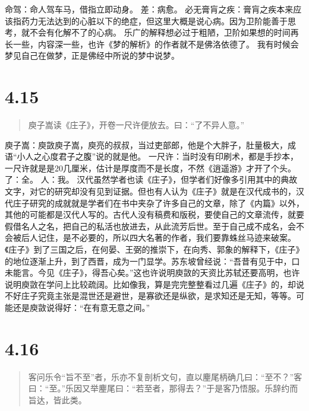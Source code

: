 \documentclass[]{book}
\begin{document}
命驾：命人驾车马，借指立即动身。 差：病愈。
必无膏肓之疾：膏肓之疾本来应该指药力无法达到的心脏以下的绝症，但这里大概是说心病。因为卫阶能善于思考，就不会有化解不了的心病。
乐广的解释想必过于粗陋，卫阶如果想的时间再长一些，内容深一些，也许《梦的解析》的作者就不是佛洛依德了。
我有时候会梦见自己在做梦，正是佛经中所说的梦中说梦。

\section{4.15}\label{section-194}

\begin{quote}
庾子嵩读《庄子》，开卷一尺许便放去。曰：``了不异人意。''
\end{quote}

庾子嵩：庾敳庾子嵩，庾亮的叔叔，当过吏部郎，他是个大胖子，肚量极大，成语``小人之心度君子之腹''说的就是他。
一尺许：当时没有印刷术，都是手抄本，一尺许就是是20几厘米，估计是厚度而不是长度，不然《逍遥游》才开了个头。了：全。
人：我。
汉代虽然学者也读《庄子》，但学者们好像多引用其中的典故文字，对它的研究却没有见到证据。但也有人认为《庄子》就是在汉代成书的，汉代庄子研究的成就就是学者们在书中夹杂了许多自己的文章，除了《内篇》以外，其他的可能都是汉代人写的。古代人没有稿费和版税，要使自己的文章流传，就要假借名人之名，把自己的私活也放进去，从此流芳后世。至于自己成不成名，会不会被后人记住，是不必要的，所以四大名著的作者，我们要靠蛛丝马迹来破案。《庄子》到了三国之后，在何晏、王弼的推崇下，在向秀、郭象的解释下，《庄子》的地位逐渐上升，到了西晋，成为一门显学。苏东坡曾经说：``吾昔有见于中，口未能言。今见《庄子》，得吾心矣。''这也许说明庾敳的天资比苏轼还要高明，也许说明庾敳在学问上比较疏阔。比如像我，算是完完整整看过几遍《庄子》的，却说不好庄子究竟主张是混世还是避世，是寡欲还是纵欲，是求知还是无知，等等。可能还是庾敳说得好：``在有意无意之间。''

\section{4.16}\label{section-195}

\begin{quote}
客问乐令``旨不至''者，乐亦不复剖析文句，直以麈尾柄确几曰：``至不？''客曰：``至。''乐因又举麈尾曰：``若至者，那得去？''于是客乃悟服。乐辞约而旨达，皆此类。
\end{quote}
\end{document}

